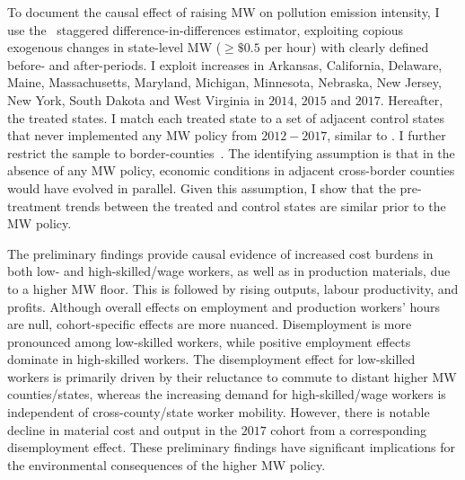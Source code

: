 \documentclass{C:/Users/david/OneDrive/Documents/ULMS/PhD/Thesis/chapter3/src/climate_change/latex/Economic_Journal/OUP-EJ}
\begin{document}
    To document the causal effect of raising MW on pollution emission intensity, I use the~\citet{sun2021estimating} staggered difference-in-differences estimator, exploiting copious exogenous changes in state-level MW ($\geq \$0.5$ per hour) with clearly defined before- and after-periods. I exploit increases in Arkansas, California, Delaware, Maine, Massachusetts, Maryland, Michigan, Minnesota, Nebraska, New Jersey, New York, South Dakota and West Virginia in $2014$, $2015$ and $2017$. Hereafter, the treated states. I match each treated state to a set of adjacent control states that never implemented any MW policy from $2012-2017$, similar to \citet{gopalan2021state}. I further restrict the sample to border-counties~\citep{dube2010minimum}. The identifying assumption is that in the absence of any MW policy, economic conditions in adjacent cross-border counties would have evolved in parallel. Given this assumption, I show that the pre-treatment trends between the treated and control states are similar prior to the MW policy.

    The preliminary findings provide causal evidence of increased cost burdens in both low- and high-skilled/wage workers, as well as in production materials, due to a higher MW floor. This is followed by rising outputs, labour productivity, and profits. Although overall effects on employment and production workers' hours are null, cohort-specific effects are more nuanced. Disemployment is more pronounced among low-skilled workers, while positive employment effects dominate in high-skilled workers. The disemployment effect for low-skilled workers is primarily driven by their reluctance to commute to distant higher MW counties/states, whereas the increasing demand for high-skilled/wage workers is independent of cross-county/state worker mobility. However, there is notable decline in material cost and output in the $2017$ cohort from a corresponding disemployment effect. These preliminary findings have significant implications for the environmental consequences of the higher MW policy.
\end{document}
